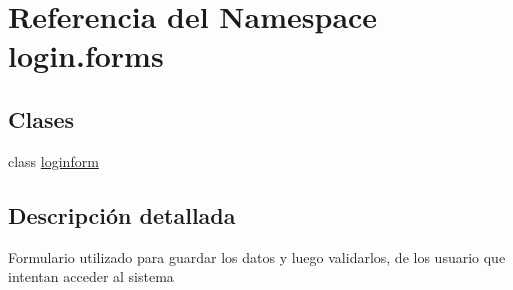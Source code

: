 \hypertarget{namespacelogin_1_1forms}{}\section{Referencia del Namespace login.\+forms}
\label{namespacelogin_1_1forms}
\subsection*{Clases}
\begin{DoxyCompactItemize}
\item 
class \hyperlink{classlogin_1_1forms_1_1loginform}{loginform}
\end{DoxyCompactItemize}


\subsection{Descripción detallada}
\begin{DoxyVerb}Formulario utilizado para guardar los datos y luego validarlos, de los usuario que intentan acceder
 al sistema\end{DoxyVerb}
 